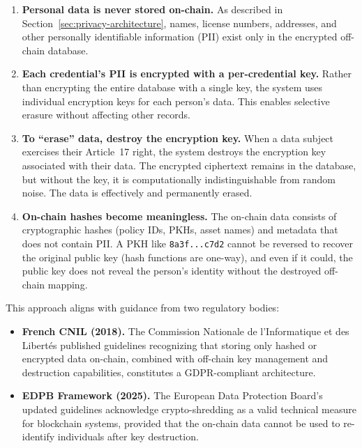\begin{enumerate}[nosep]
  \item \textbf{Personal data is never stored on-chain.}  As described in
    Section~\ref{sec:privacy-architecture}, names, license numbers,
    addresses, and other personally identifiable information (PII) exist
    only in the encrypted off-chain database.
  \item \textbf{Each credential's PII is encrypted with a per-credential
    key.}  Rather than encrypting the entire database with a single key,
    the system uses individual encryption keys for each person's data.
    This enables selective erasure without affecting other records.
  \item \textbf{To ``erase'' data, destroy the encryption key.}  When a
    data subject exercises their Article~17 right, the system destroys the
    encryption key associated with their data.  The encrypted ciphertext
    remains in the database, but without the key, it is computationally
    indistinguishable from random noise.  The data is effectively and
    permanently erased.
  \item \textbf{On-chain hashes become meaningless.}  The on-chain data
    consists of cryptographic hashes (policy IDs, PKHs, asset names) and
    metadata that does not contain PII.  A PKH like \texttt{8a3f...c7d2}
    cannot be reversed to recover the original public key (hash functions
    are one-way), and even if it could, the public key does not reveal
    the person's identity without the destroyed off-chain mapping.
\end{enumerate}

This approach aligns with guidance from two regulatory bodies:

\begin{itemize}[nosep]
  \item \textbf{French CNIL (2018).}  The Commission Nationale de
    l'Informatique et des Libert\'{e}s published guidelines recognizing
    that storing only hashed or encrypted data on-chain, combined with
    off-chain key management and destruction capabilities, constitutes
    a GDPR-compliant architecture.
  \item \textbf{EDPB Framework (2025).}  The European Data Protection Board's
    updated guidelines acknowledge crypto-shredding as a valid technical
    measure for blockchain systems, provided that the on-chain data cannot
    be used to re-identify individuals after key destruction.
\end{itemize}


